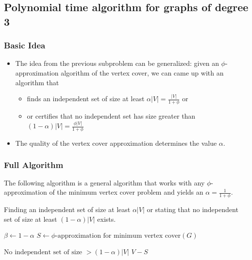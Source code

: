 \documentclass[12pt]{article}
\begin{document}
\subsection*{Polynomial time algorithm for graphs of degree 3}
\subsubsection*{Basic Idea}
\begin{itemize}
	\item The idea from the previous subproblem can be generalized: given an $\phi$-approximation algorithm of the vertex cover, we can came up with an algorithm that
	\begin{itemize}
		\item finds an independent set of size at least $\alpha |V| = \frac{|V|}{1 + \phi}$ or
		\item or certifies that no independent set has size greater than $(1 - \alpha) |V| = \frac{\phi |V|}{1 + \phi}$
	\end{itemize}
	\item The quality of the vertex cover approximation determines the value $\alpha$.
\end{itemize}

\subsubsection*{Full Algorithm}
The following algorithm is a general algorithm that works with any $\phi$-approximation of the minimum vertex cover problem and yields an $\alpha = \frac{1}{1 + \phi}$.
\begin{algorithm}
  \caption{Finding an independent set of size at least $\alpha |V|$ or stating that no independent set of size at least $(1-\alpha) |V|$ exists.}
  \begin{algorithmic}[1]
		\State $\beta \gets 1 - \alpha$
		\State $S \gets \mbox{$\phi$-approximation for minimum vertex cover}(G)$
 
			\State \Return $\mbox{No independent set of size $> (1-\alpha) |V|$}$
		\Else
			\State \Return $V-S$
		\EndIf
    \EndFunction
  \end{algorithmic}
\end{algorithm}
\end{document}
